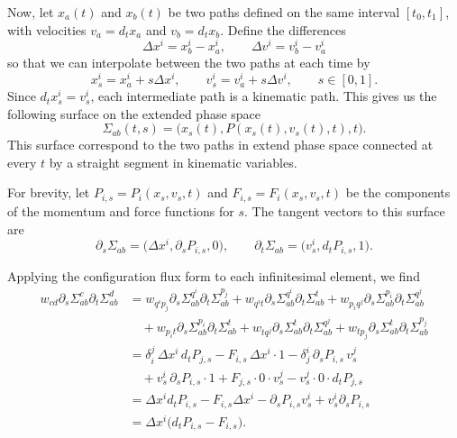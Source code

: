 \documentclass[12pt]{article}
\begin{document}
Now, let $x_a(t)$ and $x_b(t)$ be two paths defined on the same interval $[t_0,t_1]$, with velocities $v_a=d_t x_a$ and $v_b=d_t x_b$. Define the differences
\begin{equation}
	\Delta x^i=x_b^i-x_a^i,
	\qquad
	\Delta v^i=v_b^i-v_a^i
\end{equation}
so that we can interpolate between the two paths at each time by
\begin{equation}
	x_s^i=x_a^i+s\Delta x^i,
	\qquad
	v_s^i=v_a^i+s\Delta v^i,
	\qquad s\in[0,1].
\end{equation}
Since $d_t x_s^i=v_s^i$, each intermediate path is a kinematic path. This gives us the following surface on the extended phase space
\begin{equation}
	\Sigma_{ab}(t,s)
	=
	\bigl(x_s(t),P(x_s(t),v_s(t),t),t\bigr).
\end{equation}
This surface correspond to the two paths in extend phase space connected at every $t$ by a straight segment in kinematic variables.

For brevity, let $P_{i,s}=P_i(x_s,v_s,t)$ and $F_{i,s}=F_i(x_s,v_s,t)$ be the components of the momentum and force functions for $s$. The tangent vectors to this surface are
\begin{equation}
	\partial_s\Sigma_{ab}
	=
	\bigl(\Delta x^i,\partial_sP_{i,s},0\bigr),
	\qquad
	\partial_t\Sigma_{ab}
	=
	\bigl(v_s^i,d_tP_{i,s},1\bigr).
\end{equation}

Applying the configuration flux form to each infinitesimal element, we find
\begin{equation}
	\begin{aligned}
		w_{cd}\partial_s\Sigma_{ab}^{c}\partial_t\Sigma_{ab}^{d}
		&=
		w_{q^i p_j}
		\partial_s\Sigma_{ab}^{q^i}\partial_t\Sigma_{ab}^{p_j}
		+
		w_{q^i t}
		\partial_s\Sigma_{ab}^{q^i}\partial_t\Sigma_{ab}^{t} +
		w_{p_i q^j}
		\partial_s\Sigma_{ab}^{p_i}\partial_t\Sigma_{ab}^{q^j}
		\\
		&\quad+
		w_{p_i t}
		\partial_s\Sigma_{ab}^{p_i}\partial_t\Sigma_{ab}^{t} +
		w_{t q^j}
		\partial_s\Sigma_{ab}^{t}\partial_t\Sigma_{ab}^{q^j}
		+
		w_{t p_j}
		\partial_s\Sigma_{ab}^{t}\partial_t\Sigma_{ab}^{p_j}\\
		&=
		\delta_i^j\,\Delta x^i\,d_tP_{j,s}
		-F_{i,s}\,\Delta x^i\cdot1 -
		\delta_j^i\,\partial_sP_{i,s}\,v_s^j \\
		&\quad+v_s^i\,\partial_sP_{i,s}\cdot1 +
		F_{j,s}\cdot0\cdot v_s^j
		-v_s^j\cdot0\cdot d_tP_{j,s}\\
		&=
		\Delta x^i d_tP_{i,s}
		-F_{i,s}\Delta x^i
		-\partial_sP_{i,s}v_s^i
		+v_s^i\partial_sP_{i,s}\\
		&=
		\Delta x^i\bigl(d_tP_{i,s}-F_{i,s}\bigr).
	\end{aligned}
\end{equation}
\end{document}
